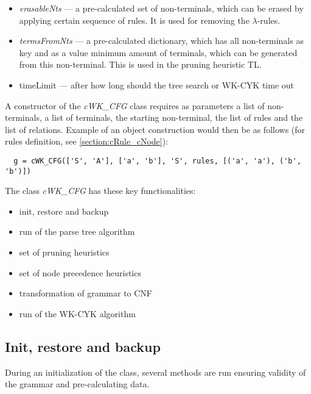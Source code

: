 \begin{itemize}
  \item{\textit{erasableNts} --- a pre-calculated set of non-terminals, which can be erased by applying certain sequence of rules. It is used for removing the $\lambda$-rules.}

  \item{\textit{termsFromNts} --- a pre-calculated dictionary, which has all non-terminals as key and as a value minimum amount of terminals, which can be generated from this non-terminal. This is used in the pruning heuristic TL.}

  \item{timeLimit --- after how long should the tree search or WK-CYK time out}
\end{itemize}

A constructor of the \textit{cWK\_CFG} class requires as parameters a list of non-terminals, a list of terminals, the starting non-terminal, the list of rules and the list of relations. Example of an object construction would then be as follows (for rules definition, see \ref{section:cRule_cNode}):
\begin{verbatim}
  g = cWK_CFG(['S', 'A'], ['a', 'b'], 'S', rules, [('a', 'a'), ('b', 'b')])
\end{verbatim}

\bigskip
The class \textit{cWK\_CFG} has these key functionalities:
\begin{itemize}
  \item{init, restore and backup}
  \item{run of the parse tree algorithm}
  \item{set of pruning heuristics}
  \item{set of node precedence heuristics}
  \item{transformation of grammar to CNF}
  \item{run of the WK-CYK algorithm}
\end{itemize}

\subsection{Init, restore and backup}
During an initialization of the class, several methods are run ensuring validity of the grammar and pre-calculating data.

